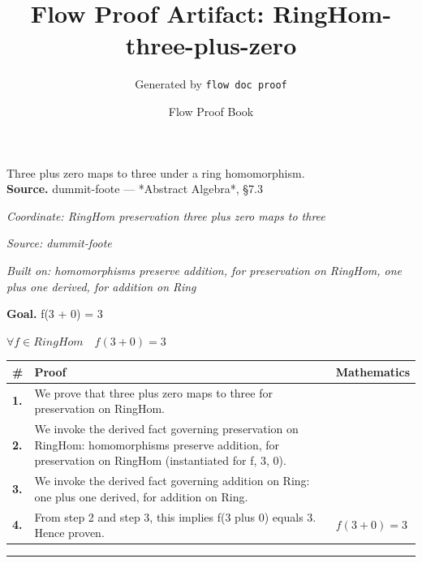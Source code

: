 \documentclass[11pt]{article}
\title{Flow Proof Artifact: RingHom-three-plus-zero}
\author{Generated by \texttt{flow doc proof}}
\date{Flow Proof Book}
\theoremstyle{definition}
\begin{document}
\maketitle
Three plus zero maps to three under a ring homomorphism.\\[0.5em]
\textbf{Source.} dummit-foote — *Abstract Algebra*, §7.3\\[0.5em]
\bigskip
{}\par
\smallskip\noindent\textit{Coordinate: RingHom \cdot preservation \cdot three plus zero maps to three}\par
\smallskip\noindent\textit{Source: dummit-foote}\par
\smallskip\noindent\textit{Built on: homomorphisms preserve addition, for preservation on RingHom, one plus one derived, for addition on Ring}\par
\medskip
\noindent\textbf{Goal.} f(3 + 0) = 3\par
\noindent$\displaystyle \forall f \in RingHom\quad f(3 + 0) = 3$\par
\medskip
\noindent
\begin{tabular}{@{} >{\raggedright\arraybackslash}p{} >{\raggedright\arraybackslash}p{} >{\raggedleft\arraybackslash}p{} @{}}
\textbf{\#} & \textbf{Proof} & \textbf{Mathematics} \\
\midrule
\textbf{1.} & We prove that three plus zero maps to three for preservation on RingHom. & \\[0.45em]
\textbf{2.} & We invoke the derived fact governing preservation on RingHom: homomorphisms preserve addition, for preservation on RingHom (instantiated for f, 3, 0). & \\[0.45em]
\textbf{3.} & We invoke the derived fact governing addition on Ring: one plus one derived, for addition on Ring. & \\[0.45em]
\textbf{4.} & From step 2 and step 3, this implies f(3 plus 0) equals 3. Hence proven. & $\displaystyle f(3 + 0) = 3$ \\[0.45em]
\bottomrule
\end{tabular}
\label{thm:RingHom-preservation-three_plus_zero_maps_to_three}
\par\medskip\hrule
\end{document}

